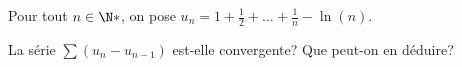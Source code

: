 \begin{enonce}
\begin{exercise}[ID={RMS133 E1436},subtitle={CCINP PC 2022},tags={},difficulty={}]
  Pour tout $n\in\N*$, on pose $u_n = 1 + \frac{1}{2} + \dots + \frac{1}{n} - \ln(n)$.

  La série $\sum \left( u_n - u_{n-1} \right)$ est-elle convergente?
  Que peut-on en déduire?
\end{exercise}
\begin{solution}
\end{solution}
\end{enonce}
